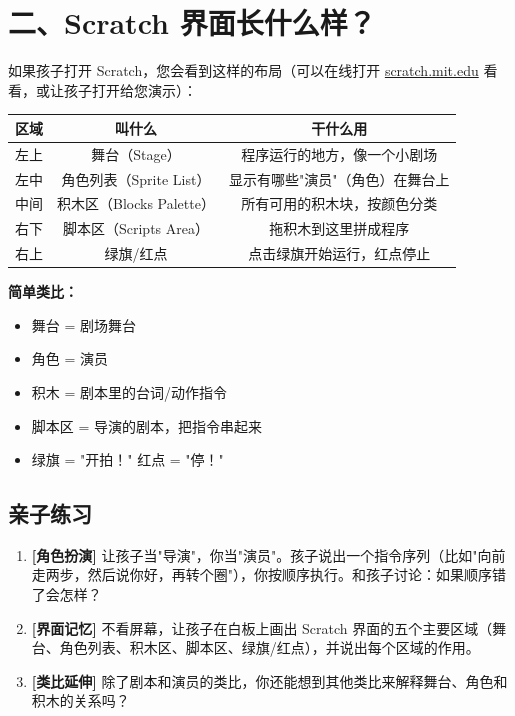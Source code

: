 \documentclass[a4paper,12pt]{ctexart}
\begin{document}
\section*{二、Scratch 界面长什么样？}

如果孩子打开 Scratch，您会看到这样的布局（可以在线打开 \href{https://scratch.mit.edu}{scratch.mit.edu} 看看，或让孩子打开给您演示）：

\begin{center}
\begin{tabular}{|c|c|c|}
\hline
\textbf{区域} & \textbf{叫什么} & \textbf{干什么用} \\ \hline
左上 & 舞台（Stage） & 程序运行的地方，像一个小剧场 \\ \hline
左中 & 角色列表（Sprite List） & 显示有哪些"演员"（角色）在舞台上 \\ \hline
中间 & 积木区（Blocks Palette） & 所有可用的积木块，按颜色分类 \\ \hline
右下 & 脚本区（Scripts Area） & 拖积木到这里拼成程序 \\ \hline
右上 & 绿旗/红点 & 点击绿旗开始运行，红点停止 \\ \hline
\end{tabular}
\end{center}

\textbf{简单类比：}
\begin{itemize}
  \item 舞台 = 剧场舞台
  \item 角色 = 演员
  \item 积木 = 剧本里的台词/动作指令
  \item 脚本区 = 导演的剧本，把指令串起来
  \item 绿旗 = "开拍！" 红点 = "停！"
\end{itemize}

\subsection*{亲子练习}

\begin{enumerate}
  \item \textbf{[角色扮演]} 让孩子当"导演"，你当"演员"。孩子说出一个指令序列（比如"向前走两步，然后说你好，再转个圈"），你按顺序执行。和孩子讨论：如果顺序错了会怎样？
  \item \textbf{[界面记忆]} 不看屏幕，让孩子在白板上画出 Scratch 界面的五个主要区域（舞台、角色列表、积木区、脚本区、绿旗/红点），并说出每个区域的作用。
  \item \textbf{[类比延伸]} 除了剧本和演员的类比，你还能想到其他类比来解释舞台、角色和积木的关系吗？
\end{enumerate}
\end{document}
